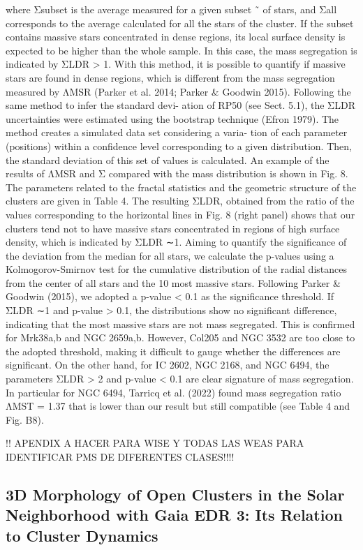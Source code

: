\documentclass[../Main.tex]{subfiles}
\begin{document}
{where
Σsubset is the average measured for a given subset
˜
of stars, and
Σall corresponds to the average calculated for
all the stars of the cluster. If the subset contains massive
stars concentrated in dense regions, its local surface density
is expected to be higher than the whole sample. In this case,
the mass segregation is indicated by ΣLDR > 1. With this
method, it is possible to quantify if massive stars are found
in dense regions, which is different from the mass segregation
measured by ΛMSR (Parker et al. 2014; Parker & Goodwin
2015).
Following the same method to infer the standard devi-
ation of RP50 (see Sect. 5.1), the ΣLDR uncertainties were
estimated using the bootstrap technique (Efron 1979). The
method creates a simulated data set considering a varia-
tion of each parameter (positions) within a confidence level
corresponding to a given distribution. Then, the standard
deviation of this set of values is calculated.
An example of the results of ΛMSR and Σ compared with
the mass distribution is shown in Fig. 8. The parameters
related to the fractal statistics and the geometric structure
of the clusters are given in Table 4. The resulting ΣLDR,
obtained from the ratio of the values corresponding to the
horizontal lines in Fig. 8 (right panel) shows that our clusters
tend not to have massive stars concentrated in regions of
high surface density, which is indicated by ΣLDR ∼1.
Aiming to quantify the significance of the deviation
from the median for all stars, we calculate the p-values using
a Kolmogorov-Smirnov test for the cumulative distribution
of the radial distances from the center of all stars and the
10 most massive stars. Following Parker & Goodwin (2015),
we adopted a p-value < 0.1 as the significance threshold.
If ΣLDR ∼1 and p-value > 0.1, the distributions show no
significant difference, indicating that the most massive stars
are not mass segregated. This is confirmed for Mrk38a,b
and NGC 2659a,b. However, Col205 and NGC 3532 are too
close to the adopted threshold, making it difficult to gauge
whether the differences are significant. On the other hand,
for IC 2602, NGC 2168, and NGC 6494, the parameters
ΣLDR > 2 and p-value < 0.1 are clear signature of mass
segregation.
In particular for NGC 6494, Tarricq et al. (2022) found
mass segregation ratio ΛMST = 1.37 that is lower than our
result but still compatible (see Table 4 and Fig. B8).

!! APENDIX A HACER PARA WISE Y TODAS LAS WEAS PARA IDENTIFICAR PMS DE DIFERENTES CLASES!!!!

\subsection{3D Morphology of Open Clusters in the Solar Neighborhood with Gaia EDR 3: Its
Relation to Cluster Dynamics}

}
\end{document}
